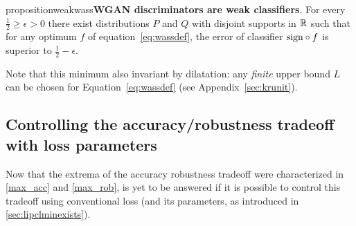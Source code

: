    \begin{restatable}{proposition}{weakwass}{\normalfont\textbf{WGAN discriminators are weak classifiers}.}\label{thm:weakwass}
        For every $\frac{1}{2}\geq\epsilon>0$ there exist distributions $P$ and $Q$ with disjoint supports in $\mathbb{R}$ such that for any optimum $f$ of equation~\ref{eq:wassdef}, the error of classifier $\text{sign}\circ f$ is superior to $\frac{1}{2}-\epsilon$.
    \end{restatable}  
    Note that this minimum also invariant by dilatation: any \textit{finite} upper bound $L$ can be chosen for Equation~\ref{eq:wassdef} (see Appendix~\ref{sec:krunit}).
      

    \subsection{Controlling the accuracy/robustness tradeoff with loss parameters}
    
    Now that the extrema of the accuracy robustness tradeoff were characterized in \ref{max_acc} and \ref{max_rob}, is yet to be answered if it is possible to control this tradeoff using conventional loss (and its parameters, as introduced in \ref{sec:lipclminexists}).
    
